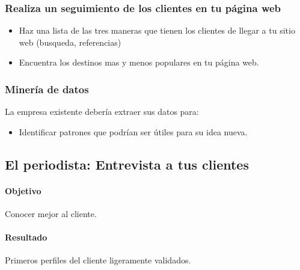 \documentclass[11pt]{book}
\begin{document}
\subsubsection{Realiza un seguimiento de los clientes en tu página web}
\begin{itemize}
\item Haz una lista de las tres maneras que tienen los clientes de llegar a tu sitio web (busqueda, referencias)
\item Encuentra los destinos mas y menos populares en tu página web.
\end{itemize}
\subsubsection{Minería de datos}
La empresa existente debería extraer sus datos para:
\begin{itemize}
\item Identificar patrones que podrían ser útiles para su idea nueva.
\end{itemize}
\subsection{El periodista: Entrevista a tus clientes}
\paragraph{Objetivo}
Conocer mejor al cliente.
\paragraph{Resultado}
Primeros perfiles del cliente ligeramente validados.
\end{document}

